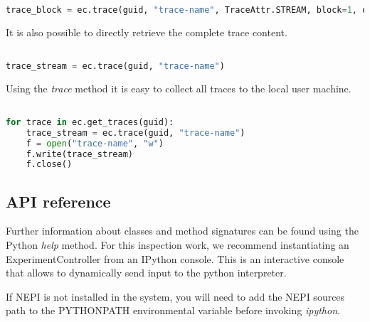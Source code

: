 \begin{lstlisting}[language=Python]

trace_block = ec.trace(guid, "trace-name", TraceAttr.STREAM, block=1, offset=0)

\end{lstlisting}

It is also possible to directly retrieve the complete trace content.

\begin{lstlisting}[language=Python]

trace_stream = ec.trace(guid, "trace-name")

\end{lstlisting}

Using the \emph{trace} method it is easy to collect all traces 
to the local user machine. 

\begin{lstlisting}[language=Python]

for trace in ec.get_traces(guid):
    trace_stream = ec.trace(guid, "trace-name")
    f = open("trace-name", "w")
    f.write(trace_stream)
    f.close()

\end{lstlisting}






\subsection{API reference}

Further information about classes and method signatures
can be found using the Python \emph{help} method.
For this inspection work, we recommend instantiating an
ExperimentController from an IPython console. This is an
interactive console that allows to dynamically send input
to the python interpreter. 

If NEPI is not installed in the system, you will need to add the
NEPI sources path to the PYTHONPATH environmental variable 
before invoking \emph{ipython}.

